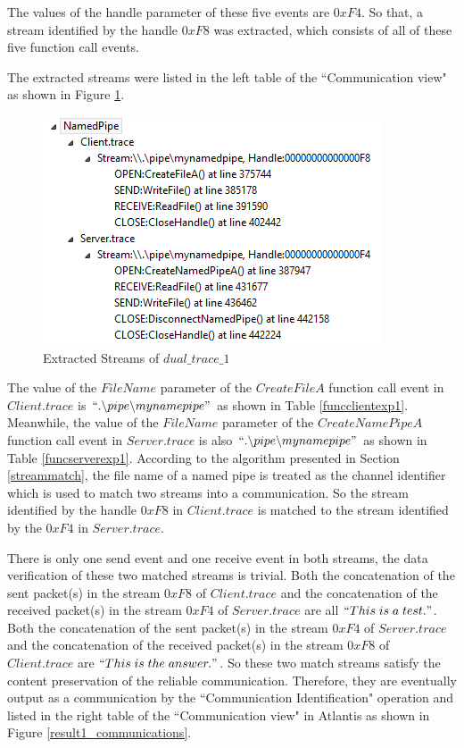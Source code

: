 The values of the handle parameter of these five events are $0xF4$. So that, a stream identified by the handle $0xF8$ was extracted, which consists of all of these five function call events. 

The extracted streams were listed in the left table of the ``Communication view"  as shown in Figure \ref{result1_streams}.

\begin{figure}[H]
\centerline{\includegraphics[scale=0.65]{Figures/result1_streams}}
 \caption{Extracted Streams of $dual\_trace\_1$}
\label{result1_streams}
\end{figure}

The value of the $FileName$ parameter of the $CreateFileA$ function call event in $Client.trace$ is $``.\backslash pipe \backslash mynamepipe"$ as shown in Table \ref{funcclientexp1}. Meanwhile, the value of the $FileName$ parameter of the $CreateNamePipeA$ function call event in $Server.trace$ is also $``.\backslash pipe \backslash mynamepipe"$ as shown in Table \ref{funcserverexp1}. According to the algorithm presented in Section \ref{streammatch}, the file name of a named pipe is treated as the channel identifier which is used to match two streams into a communication. So the stream identified by the handle $0xF8$ in $Client.trace$ is matched to the stream identified by the $0xF4$ in $Server.trace$.

There is only one send event and one receive event in both streams, the data verification of these two matched streams is trivial. Both the concatenation of the sent packet(s) in the stream $0xF8$ of $Client.trace$ and the concatenation of the received packet(s) in the stream $0xF4$ of $Server.trace$ are all $``This\; is\; a\; test."$. Both the concatenation of the sent packet(s) in the stream $0xF4$ of $Server.trace$ and the concatenation of the received packet(s) in the stream $0xF8$ of $Client.trace$ are $``This\; is\; the\; answer."$. So these two match streams satisfy the content preservation of the reliable communication. Therefore, they are eventually output as a communication by the ``Communication Identification" operation and listed in the right table of the ``Communication view" in Atlantis as shown in Figure \ref{result1_communications}.


